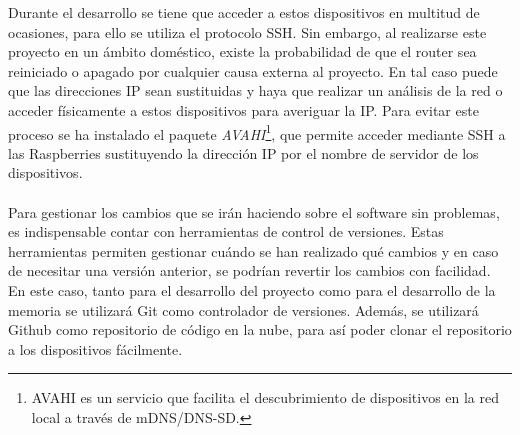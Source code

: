 Durante el desarrollo se tiene que acceder a estos dispositivos en multitud de ocasiones, para ello se utiliza el protocolo SSH. Sin embargo, al realizarse este proyecto en un ámbito doméstico, existe la probabilidad de que el router sea reiniciado o apagado por cualquier causa externa al proyecto. En tal caso puede que las direcciones IP sean sustituidas y haya que realizar un análisis de la red o acceder físicamente a estos dispositivos para averiguar la IP. Para evitar este proceso se ha instalado el paquete \textit{AVAHI}\footnote{AVAHI es un servicio que facilita el descubrimiento de dispositivos en la red local a través de mDNS/DNS-SD.}, que permite acceder mediante SSH a las Raspberries sustituyendo la dirección IP por el nombre de servidor de los dispositivos.
\\ \\
Para gestionar los cambios que se irán haciendo sobre el software sin problemas, es indispensable contar con herramientas de control de versiones. Estas herramientas permiten gestionar cuándo se han realizado qué cambios y en caso de necesitar una versión anterior, se podrían revertir los cambios con facilidad. En este caso, tanto para el desarrollo del proyecto como para el desarrollo de la memoria se utilizará Git como controlador de versiones. Además, se utilizará Github como repositorio de código en la nube, para así poder clonar el repositorio a los dispositivos fácilmente.
